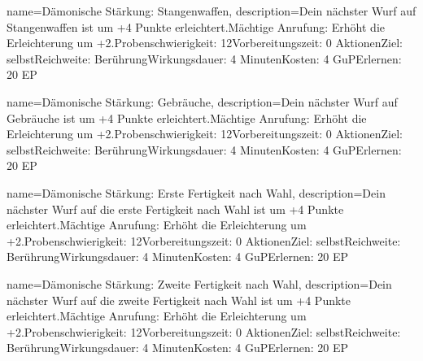 {
    name={Dämonische Stärkung: Stangenwaffen},
    description={Dein nächster Wurf auf Stangenwaffen ist um +4 Punkte erleichtert.\newline Mächtige Anrufung: Erhöht die Erleichterung um +2.\newline Probenschwierigkeit: 12\newline Vorbereitungszeit: 0 Aktionen\newline Ziel: selbst\newline Reichweite: Berührung\newline Wirkungsdauer: 4 Minuten\newline Kosten: 4 GuP\newline Erlernen: 20 EP}
}


{
    name={Dämonische Stärkung: Gebräuche},
    description={Dein nächster Wurf auf Gebräuche ist um +4 Punkte erleichtert.\newline Mächtige Anrufung: Erhöht die Erleichterung um +2.\newline Probenschwierigkeit: 12\newline Vorbereitungszeit: 0 Aktionen\newline Ziel: selbst\newline Reichweite: Berührung\newline Wirkungsdauer: 4 Minuten\newline Kosten: 4 GuP\newline Erlernen: 20 EP}
}


{
    name={Dämonische Stärkung: Erste Fertigkeit nach Wahl},
    description={Dein nächster Wurf auf die erste Fertigkeit nach Wahl ist um +4 Punkte erleichtert.\newline Mächtige Anrufung: Erhöht die Erleichterung um +2.\newline Probenschwierigkeit: 12\newline Vorbereitungszeit: 0 Aktionen\newline Ziel: selbst\newline Reichweite: Berührung\newline Wirkungsdauer: 4 Minuten\newline Kosten: 4 GuP\newline Erlernen: 20 EP}
}


{
    name={Dämonische Stärkung: Zweite Fertigkeit nach Wahl},
    description={Dein nächster Wurf auf die zweite Fertigkeit nach Wahl ist um +4 Punkte erleichtert.\newline Mächtige Anrufung: Erhöht die Erleichterung um +2.\newline Probenschwierigkeit: 12\newline Vorbereitungszeit: 0 Aktionen\newline Ziel: selbst\newline Reichweite: Berührung\newline Wirkungsdauer: 4 Minuten\newline Kosten: 4 GuP\newline Erlernen: 20 EP}
}



